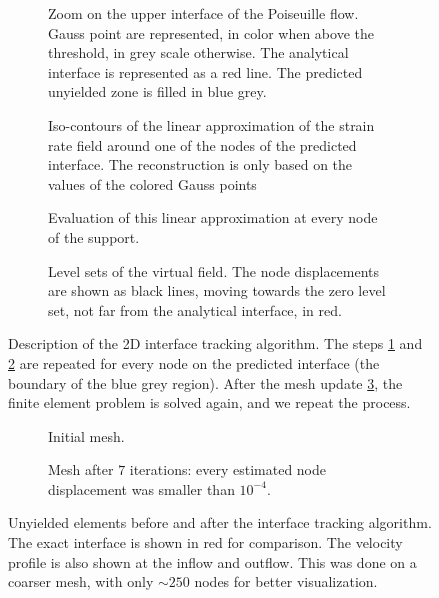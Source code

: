 \documentclass[11 pt]{report}
\begin{document}
\vfill
\begin{figure}[H]
    \centering
    \begin{subfigure}[t]{0.48\textwidth}
        
        \caption{Zoom on the upper interface of the Poiseuille flow. Gauss point are represented, in color when above the threshold, in grey scale otherwise. The analytical interface is represented as a red line. The predicted unyielded zone is filled in blue grey.}
    \end{subfigure}\hfill
    \begin{subfigure}[t]{0.48\textwidth}
        
        \caption{Iso-contours of the linear approximation of the strain rate field around one of the nodes of the predicted interface. The reconstruction is only based on the values of the colored Gauss points}
        \label{fig:build_approx}
    \end{subfigure}\vspace{20pt}
    \begin{subfigure}[t]{0.48\textwidth}
        
        \caption{Evaluation of this linear approximation at every node of the support.}
        \label{fig:eval_approx}
    \end{subfigure}\hfill
    \begin{subfigure}[t]{0.48\textwidth}
        
        \caption{Level sets of the virtual field. The node displacements are shown as black lines, moving towards the zero level set, not far from the analytical interface, in red.}
        \label{fig:targets}
    \end{subfigure}
    \caption{Description of the 2D interface tracking algorithm. The steps \ref{fig:build_approx} and \ref{fig:eval_approx} are repeated for every node on the predicted interface (the boundary of the blue grey region). After the mesh update \ref{fig:targets}, the finite element problem is solved again, and we repeat the process.}
    \label{fig:rec2d_a}
\end{figure}
\vfill

\begin{figure}[H]
    \centering
    \begin{subfigure}[t]{\textwidth}
        
        \caption{Initial mesh.}
    \end{subfigure}
    \begin{subfigure}[t]{\textwidth}
        
        \caption{Mesh after $7$ iterations: every estimated node displacement was smaller than $10^{-4}$.}
    \end{subfigure}
    \caption{Unyielded elements before and after the interface tracking algorithm. The exact interface is shown in red for comparison. The velocity profile is also shown at the inflow and outflow. This was done on a coarser mesh, with only $\sim 250$ nodes for better visualization.}
\end{figure}
\end{document}
